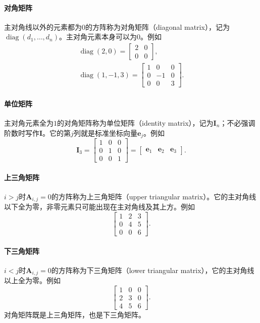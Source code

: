 \paragraph{对角矩阵}
主对角线以外的元素都为$0$的方阵称为对角矩阵（diagonal matrix），记为$\operatorname{diag}(d_1,\ldots,d_n)$。主对角元素本身可以为$0$。例如
\[
\begin{gathered}
\operatorname{diag}(2,0)=\begin{bmatrix}2&0\\0&0\end{bmatrix},\\
\operatorname{diag}(1,-1,3)=\begin{bmatrix}1&0&0\\0&-1&0\\0&0&3\end{bmatrix}.
\end{gathered}
\]

\paragraph{单位矩阵}
主对角元素全为$1$的对角矩阵称为单位矩阵（identity matrix），记为$\bm I_n$；不必强调阶数时写作$\bm I$。它的第$j$列就是标准坐标向量$\bm e_j$。例如
\[
 \bm I_3=\begin{bmatrix}1&0&0\\0&1&0\\0&0&1\end{bmatrix}=\begin{bmatrix}\bm e_1&\bm e_2&\bm e_3\end{bmatrix}.
\]

\paragraph{上三角矩阵}
$i>j$时$\bm A_{i,j}=0$的方阵称为上三角矩阵（upper triangular matrix）。它的主对角线以下全为零，非零元素只可能出现在主对角线及其上方。例如
\[
 \begin{bmatrix}1&2&3\\0&4&5\\0&0&6\end{bmatrix}.
\]

\paragraph{下三角矩阵}
$i<j$时$\bm A_{i,j}=0$的方阵称为下三角矩阵（lower triangular matrix），它的主对角线以上全为零。例如
\[
 \begin{bmatrix}1&0&0\\2&3&0\\4&5&6\end{bmatrix}.
\]
对角矩阵既是上三角矩阵，也是下三角矩阵。

